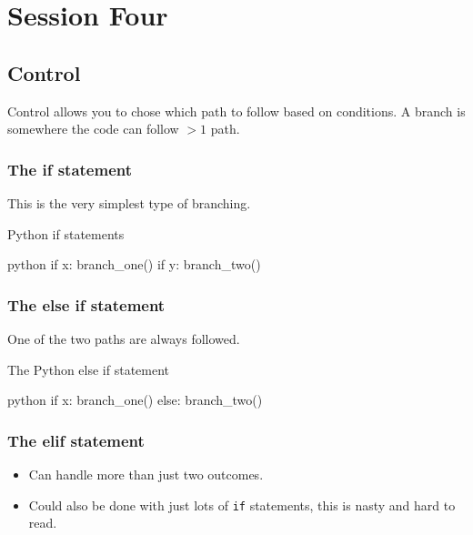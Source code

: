 \section{Session Four}\label{sec:session_four}

\subsection{Control}\label{sub:control}

Control allows you to chose which path to follow based on conditions.
A branch is somewhere the code can follow \(>1\) path.

\subsubsection{The if statement}\label{ssub:the-if-statement}

This is the very simplest type of branching.
\begin{highlight}{Python if statements}
	\begin{code}{python}
		if x:
		branch_one()
		if y:
		branch_two()
	\end{code}
\end{highlight}

\subsubsection{The else if statement}\label{ssub:the-else-if-statement}

One of the two paths are always followed.
\begin{highlight}{The Python else if statement}
	\begin{code}{python}
		if x:
		branch_one()
		else:
		branch_two()
	\end{code}
\end{highlight}

\subsubsection{The elif statement}\label{ssub:the-elif-statement}

\begin{itemize}
	\item Can handle more than just two outcomes.
	\item Could also be done with just lots of \texttt{if} statements, this is nasty and hard to read.
\end{itemize}

